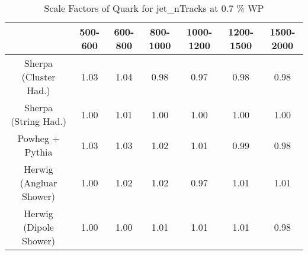 \begin{table}
\centering
\caption{Scale Factors of Quark for jet_nTracks at 0.7 \% WP}
\label{tab:SF_MC_jet_nTracks_0.7_Quark}
\begin{tabular}{ccccccc}
\toprule
{} &  500-600 &  600-800 &  800-1000 &  1000-1200 &  1200-1500 &  1500-2000 \\
\midrule
Sherpa (Cluster Had.)   &     1.03 &     1.04 &      0.98 &       0.97 &       0.98 &       0.98 \\
Sherpa (String Had.)    &     1.00 &     1.01 &      1.00 &       1.00 &       1.00 &       1.00 \\
Powheg + Pythia         &     1.03 &     1.03 &      1.02 &       1.01 &       0.99 &       0.98 \\
Herwig (Angluar Shower) &     1.00 &     1.02 &      1.02 &       0.97 &       1.01 &       1.01 \\
Herwig (Dipole Shower)  &     1.00 &     1.00 &      1.01 &       1.01 &       1.01 &       0.98 \\
\bottomrule
\end{tabular}
\end{table}
